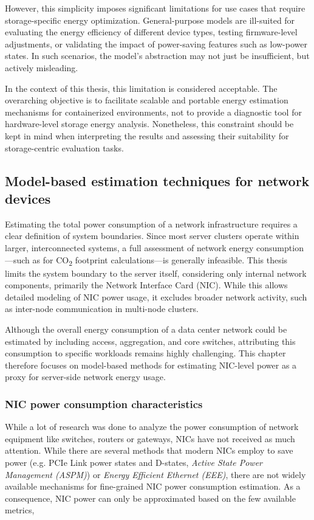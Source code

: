 However, this simplicity imposes significant limitations for use cases that require storage-specific energy optimization. General-purpose models are ill-suited for evaluating the energy efficiency of different device types, testing firmware-level adjustments, or validating the impact of power-saving features such as low-power states. In such scenarios, the model’s abstraction may not just be insufficient, but actively misleading.

In the context of this thesis, this limitation is considered acceptable. The overarching objective is to facilitate scalable and portable energy estimation mechanisms for containerized environments, not to provide a diagnostic tool for hardware-level storage energy analysis. Nonetheless, this constraint should be kept in mind when interpreting the results and assessing their suitability for storage-centric evaluation tasks.

\subsection{Model-based estimation techniques for network devices}

Estimating the total power consumption of a network infrastructure requires a clear definition of system boundaries. Since most server clusters operate within larger, interconnected systems, a full assessment of network energy consumption—such as for CO\textsubscript{2} footprint calculations—is generally infeasible. This thesis limits the system boundary to the server itself, considering only internal network components, primarily the Network Interface Card (NIC). While this allows detailed modeling of NIC power usage, it excludes broader network activity, such as inter-node communication in multi-node clusters.

Although the overall energy consumption of a data center network could be estimated by including access, aggregation, and core switches, attributing this consumption to specific workloads remains highly challenging. This chapter therefore focuses on model-based methods for estimating NIC-level power as a proxy for server-side network energy usage.

\subsubsection{NIC power consumption characteristics}
While a lot of research was done to analyze the power consumption of network equipment like switches, routers or gateways, NICs have not received as much attention. While there are several methods that modern NICs employ to save power (e.g. PCIe Link power states and D-states, \textit{Active State Power Management (ASPM)}) or \textit{Energy Efficient Ethernet (EEE)}, there are not widely available mechanisms for fine-grained NIC power consumption estimation. As a consequence, NIC power can only be approximated based on the few available metrics, 

